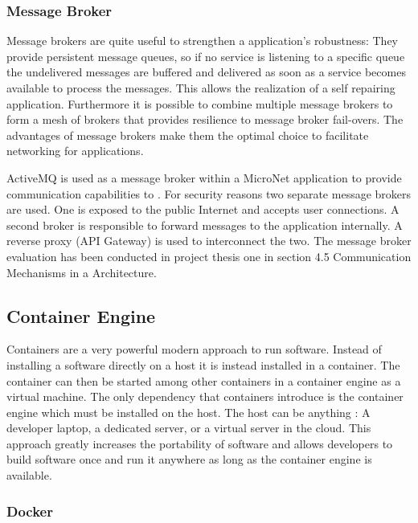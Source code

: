 \subsubsection{Message Broker}

Message brokers are quite useful to strengthen a \ms{} application's robustness:
They provide persistent message queues, so if no service is listening to a
specific queue the undelivered messages are buffered and delivered as soon as a
service becomes available to process the messages. This allows the realization
of a self repairing application. Furthermore it is possible to combine multiple
message brokers to form a mesh of brokers that provides resilience to message
broker fail-overs. The advantages of message brokers make them the optimal
choice to facilitate networking for \ms{} \og{} applications.

ActiveMQ is used as a message broker within a MicroNet application to provide
communication capabilities to \mss{}. For security reasons two separate message
brokers are used. One is exposed to the public Internet and accepts user
connections. A second broker is responsible to forward messages to the
application internally. A reverse proxy (API Gateway) is used to interconnect
the two. The message broker evaluation has been conducted in project thesis one
\cite{biedermann2015project1} in section 4.5 Communication Mechanisms in a \ms{}
Architecture.

\subsection{Container Engine}

Containers are a very powerful modern approach to run software. Instead of
installing a software directly on a host it is instead installed in a container.
The container can then be started among other containers in a container engine
as a virtual machine. The only dependency that containers introduce is the
container engine which must be installed on the host. The host can be anything :
A developer laptop, a dedicated server, or a virtual server in the cloud.
This approach greatly increases the portability of software and allows
developers to build software once and run it anywhere as long as the container
engine is available.

\subsubsection{Docker}

